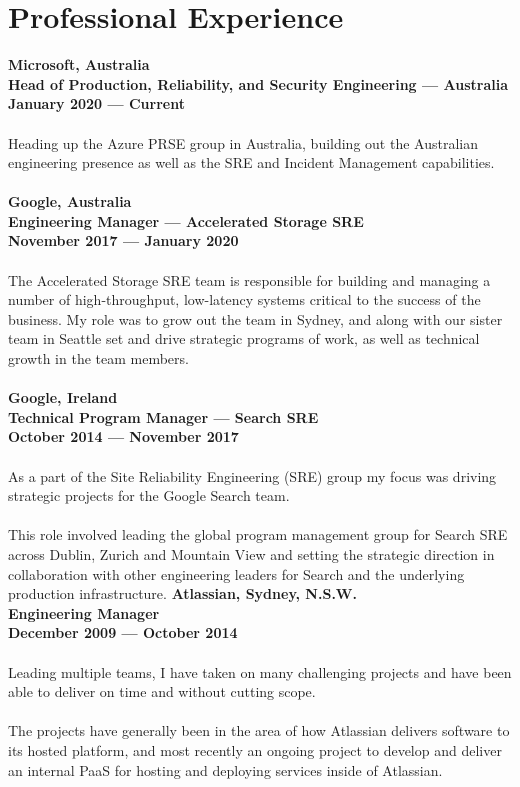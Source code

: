 \documentclass[a4paper]{article}
\begin{document}
\section*{Professional Experience}
\textbf{Microsoft, Australia\\Head of Production, Reliability, and Security Engineering --- Australia\\January 2020 --- Current}\\\\
Heading up the Azure PRSE group in Australia, building out the Australian engineering presence as well as the SRE and Incident Management capabilities.
\\\\
\textbf{Google, Australia\\Engineering Manager --- Accelerated Storage SRE\\November 2017 --- January 2020}\\\\
The Accelerated Storage SRE team is responsible for building and managing a number of high-throughput, low-latency systems critical to the success of the business. My role was to grow out the team in Sydney, and along with our sister team in Seattle set and drive strategic programs of work, as well as technical growth in the team members.
\\\\
\textbf{Google, Ireland\\Technical Program Manager --- Search SRE\\October 2014 --- November 2017}\\\\
As a part of the Site Reliability Engineering (SRE) group my focus was driving strategic projects for the Google Search team.
\\\\
This role involved leading the global program management group for Search SRE across Dublin, Zurich and Mountain View and setting the strategic direction in collaboration with other engineering leaders for Search and the underlying production infrastructure.
\pagebreak
\ryanHeaderSmall
\textbf{Atlassian, Sydney, N.S.W.\\Engineering Manager\\December 2009 --- October 2014}\\\\
Leading multiple teams, I have taken on many challenging projects and have been able to deliver on time and without cutting scope.
\\\\The projects have generally been in the area of how Atlassian delivers software to its hosted platform, and most recently an ongoing project to develop and deliver an internal PaaS for hosting and deploying services inside of Atlassian.
\end{document}
